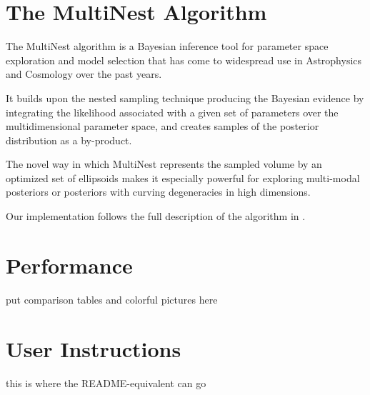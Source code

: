 \documentclass{article}
\begin{document}
\section{The MultiNest Algorithm}
The MultiNest algorithm is a Bayesian inference tool for parameter space exploration and model selection that has come to widespread use in Astrophysics and Cosmology over the past years. 

It builds upon the nested sampling technique producing the Bayesian evidence by integrating the likelihood associated with a given set of parameters over the multidimensional parameter space, and creates samples of the posterior distribution as a by-product.

The novel way in which MultiNest represents the sampled volume by an optimized set of ellipsoids makes it especially powerful for exploring multi-modal posteriors or posteriors with curving degeneracies in high dimensions.

Our implementation follows the full description of the algorithm in \cite{2009MNRAS.398.1601F}.
\section{Performance}
put comparison tables and colorful pictures here
\section{User Instructions}
this is where the README-equivalent can go


\end{document}
